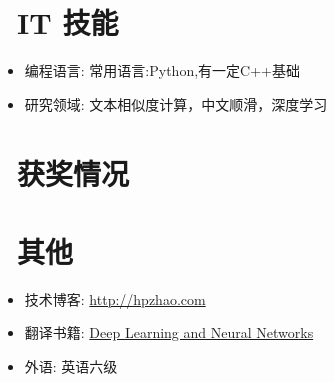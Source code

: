 \documentclass{resume}
\begin{document}
\section{\faCogs\ IT 技能}
\begin{itemize}[parsep=0.5ex]
  \item 编程语言: 常用语言:Python,有一定C++基础
  \item 研究领域: 文本相似度计算，中文顺滑，深度学习
  
\end{itemize}

\section{\faHeartO\ 获奖情况}

\section{\faInfo\ 其他}
\begin{itemize}[parsep=0.5ex]
  \item 技术博客: \href{http://hpzhao.com}{http://hpzhao.com}
  \item 翻译书籍: \href{http://hpzhao.com/2016/07/10/%E3%80%90%E8%AF%91%E3%80%91%E7%A5%9E%E7%BB%8F%E7%BD%91%E7%BB%9C%E4%B8%8E%E6%B7%B1%E5%BA%A6%E5%AD%A6%E4%B9%A0/}{Deep Learning and Neural Networks}
  \item 外语: 英语六级
\end{itemize}
\end{document}
